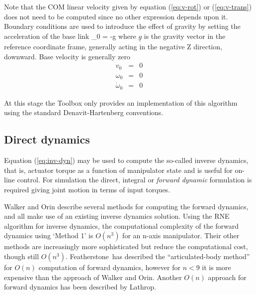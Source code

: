 \documentclass{article}
\newcommand{\DEF}[1]{{\it#1}}
\renewcommand{\vec}[1]{\underline{#1}}
\begin{document}
\noindent
Note that the COM linear velocity given by equation (\ref{eq:v-rot}) or
(\ref{eq:v-trans}) does not need to be computed since no other
expression depends upon it.
Boundary conditions are used to introduce the effect of gravity by setting the
acceleration of the base link
\be
{}_0 = -\vec{g}
\ee
where $\vec{g}$ is the gravity vector in the reference coordinate 
frame, generally acting in the negative Z direction, downward.
Base velocity is generally zero
\begin{eqnarray}
v_0 &=& 0       \\
\omega_0 &=& 0 \\
\dot{\omega}_0 &=& 0
\end{eqnarray}

At this stage the Toolbox only provides an implementation of this algorithm
using the standard Denavit-Hartenberg conventions.

\subsection{Direct dynamics}  \label{robot:direct-dyn}
Equation (\ref{eq:inv-dyn}) may be used to compute the so-called inverse dynamics, that is,
actuator torque as a function
of manipulator state and is useful for on-line control.
For simulation the direct, integral or \DEF{forward dynamic} formulation is required 
giving joint motion in terms of input torques.  

Walker and Orin\cite{Walker82} describe several
methods for computing the forward dynamics, and all make use of an
existing inverse dynamics solution.
Using the RNE algorithm for inverse dynamics, the computational complexity of
the forward dynamics using `Method 1'  is $O(n^3)$ for an n-axis manipulator.
Their other methods are increasingly more sophisticated but reduce the computational
cost, though still $O(n^3)$.
Featherstone\cite{Featherstone87}\
has described the ``articulated-body method'' for $O(n)$ computation of
forward dynamics, however for $n < 9$ it is more expensive than the 
approach of Walker and Orin.
Another $O(n)$ approach for forward
dynamics has been described by Lathrop\cite{Lathrop86}.
\end{document}
